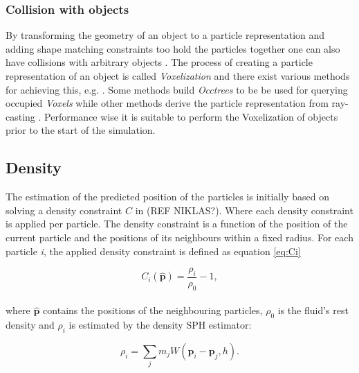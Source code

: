 \subsubsection{Collision with objects}

By transforming the geometry of an object to a particle representation and adding shape matching constraints too hold the particles together one can also have collisions with arbitrary objects \cite{muller2005meshless, macklin2014unified}. The process of creating a particle representation of an object is called \textit{Voxelization} and there exist various methods for achieving this, e.g. \cite{VoxPolygon, VoxSingle}. Some methods build \textit{Occtrees} to be be used for querying occupied \textit{Voxels} while other methods derive the particle representation from ray-casting \cite{VoxSingle}. Performance wise it is suitable to perform the Voxelization of objects prior to the start of the simulation.


\subsection{Density}

The estimation of the predicted position of the particles is initially based on solving a density constraint $C$ in (REF NIKLAS?). Where each density constraint is applied per particle. The density constraint is a function of the position of the current particle and the positions of its neighbours within a fixed radius. For each particle \textit{i}, the applied density constraint is defined as equation \ref{eq:Ci}

\begin{equation}
\label{eq:Ci}
C_i(\hat{\mathbf{p}}) = \frac{\rho_i}{\rho_0} - 1,
\end{equation}
\\
where $\hat{\mathbf{p}}$ contains the positions of the neighbouring particles, $\rho_0$ is the fluid's rest density and $\rho_i$ is estimated by the density SPH estimator:

\begin{equation}
\label{eq:Rhoi}
\rho_i = \sum\limits_{j} m_j W(\mathbf{p}_i - \mathbf{p}_j, h).
\end{equation}

